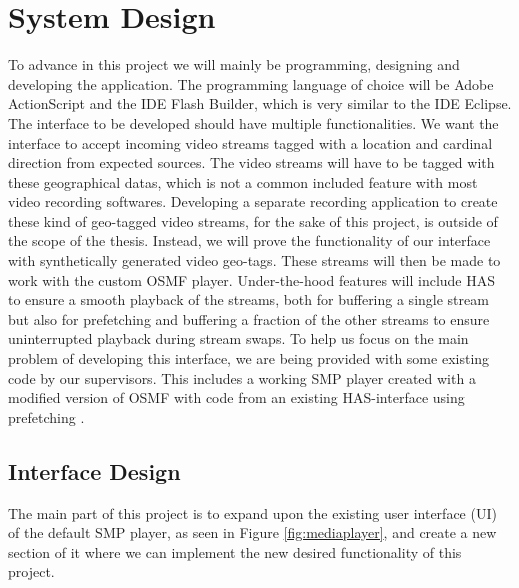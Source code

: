 \chapter{System Design}
\label{cha:sysdesign}

To advance in this project we will mainly be programming, designing and developing the application. The programming language of choice will be Adobe ActionScript and the IDE Flash Builder, which is very similar to the IDE Eclipse. The interface to be developed should have multiple functionalities. We want the interface to accept incoming video streams tagged with a location and cardinal direction from expected sources. The video streams will have to be tagged with these geographical datas, which is not a common included feature with most video recording softwares. Developing a separate recording application to create these kind of geo-tagged video streams, for the sake of this project, is outside of the scope of the thesis. Instead, we will prove the functionality of our interface with synthetically generated video geo-tags. These streams will then be made to work with the custom OSMF player.  Under-the-hood features will include HAS to ensure a smooth playback of the streams, both for buffering a single stream but also for prefetching and buffering a fraction of the other streams to ensure uninterrupted playback during stream swaps. To help us focus on the main problem of developing this interface, we are being provided with some existing code by our supervisors. This includes a working SMP player created with a modified version of OSMF with code from an existing HAS-interface using prefetching \cite{qualbranch}.

\section{Interface Design}
\label{sec:interfacedesign}

The main part of this project is to expand upon the existing user interface (UI) of the default SMP player, as seen in Figure \ref{fig:mediaplayer}, and create a new section of it where we can implement the new desired functionality of this project. 


